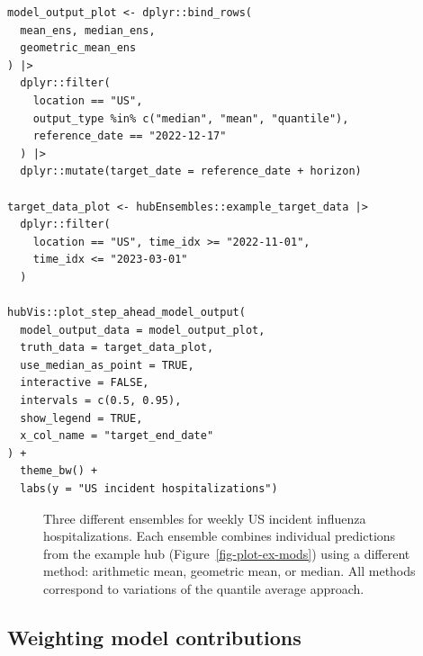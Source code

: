 \documentclass[
  article,
  shortnames,
  notitle]{jss}
\begin{document}
\begin{verbatim}
model_output_plot <- dplyr::bind_rows(
  mean_ens, median_ens,
  geometric_mean_ens
) |>
  dplyr::filter(
    location == "US",
    output_type %in% c("median", "mean", "quantile"),
    reference_date == "2022-12-17"
  ) |>
  dplyr::mutate(target_date = reference_date + horizon)

target_data_plot <- hubEnsembles::example_target_data |>
  dplyr::filter(
    location == "US", time_idx >= "2022-11-01",
    time_idx <= "2023-03-01"
  )

hubVis::plot_step_ahead_model_output(
  model_output_data = model_output_plot,
  truth_data = target_data_plot,
  use_median_as_point = TRUE,
  interactive = FALSE,
  intervals = c(0.5, 0.95),
  show_legend = TRUE,
  x_col_name = "target_end_date"
) +
  theme_bw() +
  labs(y = "US incident hospitalizations")
\end{verbatim}

\begin{figure}[H]


\caption{\label{fig-plot-ensembles}Three different ensembles for weekly
US incident influenza hospitalizations. Each ensemble combines
individual predictions from the example hub
(Figure~\ref{fig-plot-ex-mods}) using a different method: arithmetic
mean, geometric mean, or median. All methods correspond to variations of
the quantile average approach.}

\end{figure}%

\subsection{Weighting model
contributions}\label{weighting-model-contributions}
\end{document}
